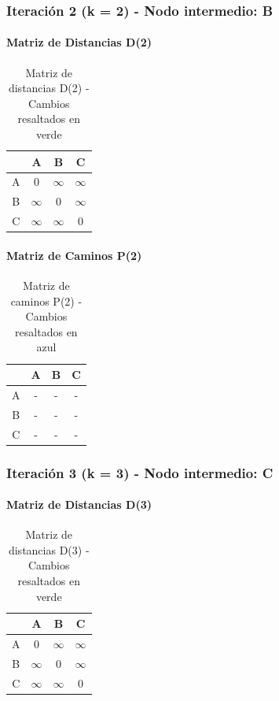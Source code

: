\documentclass[12pt]{article}
\begin{document}
\subsubsection{Iteración 2 (k = 2) - Nodo intermedio: B}
\paragraph{Matriz de Distancias D(2)}
\begin{table}[h!]
\centering
\begin{tabular}{|c|c|c|c|}
\hline
 & A & B & C \\\hline
A & 0 & $\infty$ & $\infty$ \\\hline
B & $\infty$ & 0 & $\infty$ \\\hline
C & $\infty$ & $\infty$ & 0 \\\hline
\end{tabular}
\caption{Matriz de distancias D(2) - Cambios resaltados en verde}
\end{table}

\paragraph{Matriz de Caminos P(2)}
\begin{table}[h!]
\centering
\begin{tabular}{|c|c|c|c|}
\hline
 & A & B & C \\\hline
A & - & - & - \\\hline
B & - & - & - \\\hline
C & - & - & - \\\hline
\end{tabular}
\caption{Matriz de caminos P(2) - Cambios resaltados en azul}
\end{table}

\subsubsection{Iteración 3 (k = 3) - Nodo intermedio: C}
\paragraph{Matriz de Distancias D(3)}
\begin{table}[h!]
\centering
\begin{tabular}{|c|c|c|c|}
\hline
 & A & B & C \\\hline
A & 0 & $\infty$ & $\infty$ \\\hline
B & $\infty$ & 0 & $\infty$ \\\hline
C & $\infty$ & $\infty$ & 0 \\\hline
\end{tabular}
\caption{Matriz de distancias D(3) - Cambios resaltados en verde}
\end{table}
\end{document}
